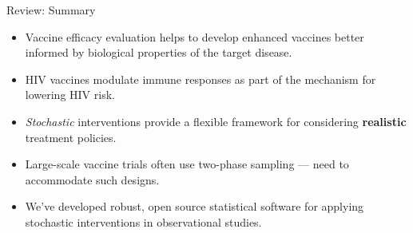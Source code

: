 \documentclass{beamer}
\begin{document}

\begin{frame}[c]{Review: Summary}

\begin{center}
\begin{itemize}
  \itemsep8pt
  \item Vaccine efficacy evaluation helps to develop enhanced vaccines better
    informed by biological properties of the target disease.
  \item HIV vaccines modulate immune responses as part of the mechanism for
    lowering HIV risk.
  \item \textit{Stochastic} interventions provide a flexible framework for
    considering \textbf{realistic} treatment policies.
  \item Large-scale vaccine trials often use two-phase sampling --- need to
    accommodate such designs.
  \item We've developed robust, open source statistical software for applying
    stochastic interventions in observational studies.
\end{itemize}
\end{center}


\end{frame}


\setbeamercovered{}
\beamerdefaultoverlayspecification{}

\begin{frame}[c,allowframebreaks]{}

\small

\nocite{*}


\end{frame}

\end{document}
